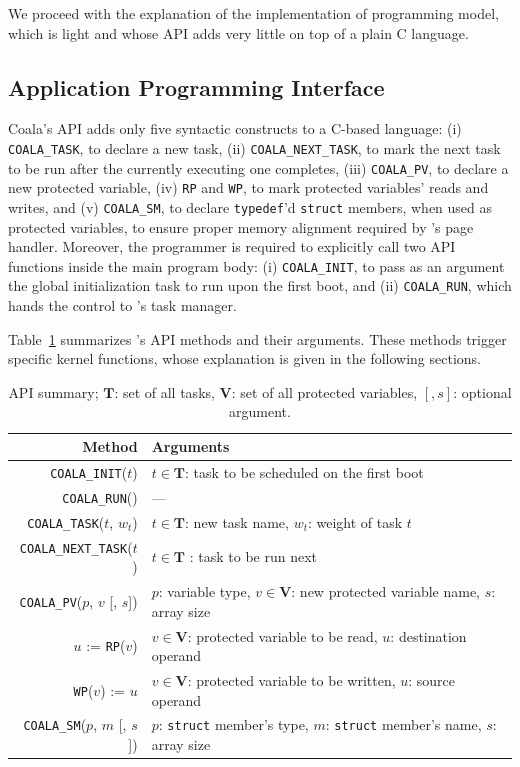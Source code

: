 We proceed with the explanation of the implementation of \sys programming model, which is light and whose API adds very little on top of a plain C language.

\subsection{Application Programming Interface}
\label{sec:coala_api}

Coala's API adds only five syntactic constructs to a C-based language: (i) \texttt{COALA\_TASK}, to declare a new task, (ii) \texttt{COALA\_NEXT\_TASK}, to mark the next task to be run after the currently executing one completes, (iii) \texttt{COALA\_PV}, to declare a new protected variable, (iv) \texttt{RP} and \texttt{WP}, to mark protected variables' reads and writes, and (v) \texttt{COALA\_SM}, to declare \texttt{typedef}'d \texttt{struct} members, when used as protected variables, to ensure proper memory alignment required by \sys's page handler. Moreover, the programmer is required to explicitly call two API functions inside the main program body: (i) \texttt{COALA\_INIT}, to pass as an argument the global initialization task to run upon the first boot, and (ii) \texttt{COALA\_RUN}, which hands the control to \sys's task manager.

Table~\ref{table:coala_api} summarizes \sys's API methods and their arguments.  These methods trigger specific \sys kernel functions, whose explanation is given in the following sections.

\begin{table}
\centering
\begin{tabular}{| r | p{} |}
	\hline
	{Method} & {Arguments} \\
	\hline\hline
	\texttt{COALA\_INIT}($t$) & $t \in \mathbf{T}$: task to be scheduled on the first boot \\
	\hline
	\texttt{COALA\_RUN}() & --- \\
	\hline
	\texttt{COALA\_TASK}($t$, $w_t$) & $t \in \mathbf{T}$: new task name, $w_t$: weight of task $t$ \\
	\hline
	\texttt{COALA\_NEXT\_TASK}($t$) & $t \in \mathbf{T}$ : task to be run next \\
	\hline
	\texttt{COALA\_PV}($p$, $v$ [, $s$]) & $p$: variable type, $v \in \mathbf{V}$: new protected variable name, $s$: array size \\
	\hline
	$u$ := \texttt{RP}($v$) & $v \in \mathbf{V}$: protected variable to be read, $u$: destination operand \\
	\hline	
	\texttt{WP}($v$) := $u$ &  $v \in \mathbf{V}$: protected variable to be written, $u$: source operand \\
	\hline
	\texttt{COALA\_SM}($p$, $m$ [, $s$]) & $p$: \texttt{struct} member's type, $m$: \texttt{struct} member's name, $s$: array size \\
	\hline
\end{tabular}
\caption{API summary; $\mathbf{T}$: set of all tasks, $\mathbf{V}$: set of all protected variables, $[, s]$: optional argument.}
\label{table:coala_api}
\end{table}

